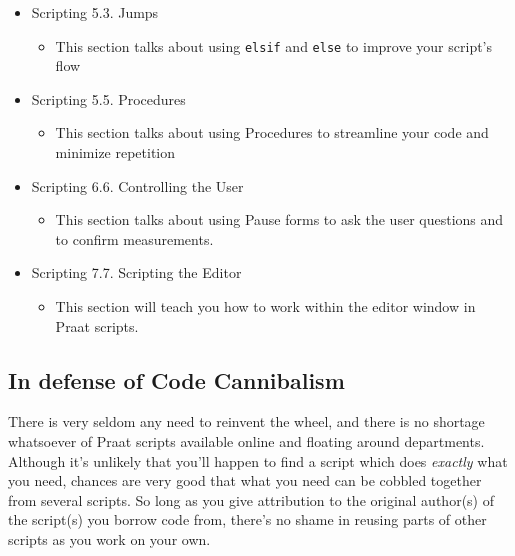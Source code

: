 \documentclass[11pt]{article}
\def\tightlist{}
\begin{document}
\begin{itemize}
\tightlist
\item
  Scripting 5.3. Jumps

  \begin{itemize}
  \tightlist
  \item
    This section talks about using \texttt{elsif} and \texttt{else} to
    improve your script's flow
  \end{itemize}
\item
  Scripting 5.5. Procedures

  \begin{itemize}
  \tightlist
  \item
    This section talks about using Procedures to streamline your code
    and minimize repetition
  \end{itemize}
\item
  Scripting 6.6. Controlling the User

  \begin{itemize}
  \tightlist
  \item
    This section talks about using Pause forms to ask the user questions
    and to confirm measurements.
  \end{itemize}
\item
  Scripting 7.7. Scripting the Editor

  \begin{itemize}
  \tightlist
  \item
    This section will teach you how to work within the editor window in
    Praat scripts.
  \end{itemize}
\end{itemize}

\hypertarget{in-defense-of-code-cannibalism}{%
\subsection{In defense of Code
Cannibalism}\label{in-defense-of-code-cannibalism}}

There is very seldom any need to reinvent the wheel, and there is no
shortage whatsoever of Praat scripts available online and floating
around departments. Although it's unlikely that you'll happen to find a
script which does \emph{exactly} what you need, chances are very good
that what you need can be cobbled together from several scripts. So long
as you give attribution to the original author(s) of the script(s) you
borrow code from, there's no shame in reusing parts of other scripts as
you work on your own.
\end{document}
